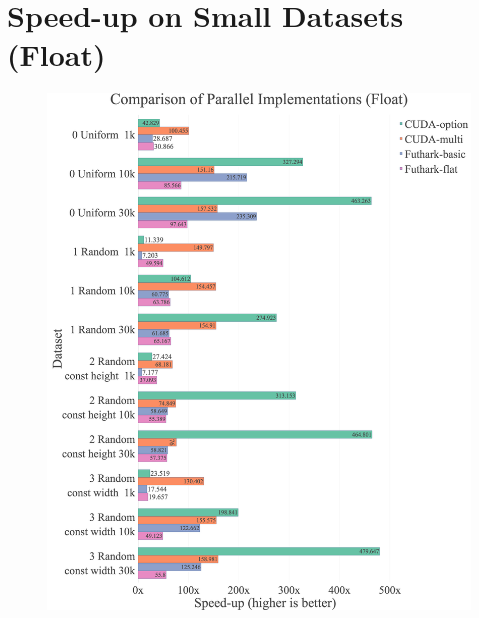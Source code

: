 \section{Speed-up on Small Datasets (Float)}
\begin{figure}[H]
\begin{adjustwidth}{-2cm}{-2cm}
	\centering
    \includegraphics[width=1\textwidth]{img/experiments/small-all-approaches-float.png}
\end{adjustwidth}
\end{figure}

